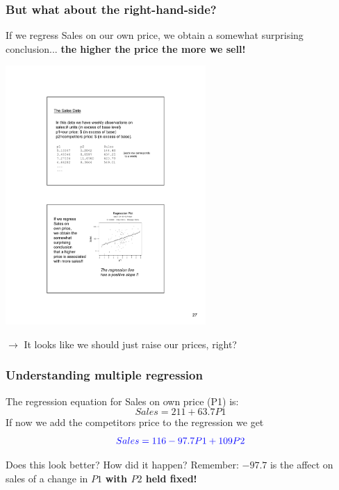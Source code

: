 \documentclass{beamer}
\newcommand{\sk}{\vspace{.5cm}}
\begin{document}
\begin{frame}
\frametitle{But what about the right-hand-side?}


If we regress Sales on our own price, we obtain a somewhat surprising conclusion... {\color{burntorange}\bf the higher the price the more we sell!}

\vspace{2mm}
\hspace*{10mm}\includegraphics[width=3in]{figures/Sales1}





$\rightarrow$ It looks like we should just raise our prices, right?

\end{frame}


\begin{frame}
\frametitle{Understanding multiple regression}

The regression equation for Sales on own price (P1) is: \sk
$$
Sales = 211 + 63.7 P1
$$
If now we add the competitors price to the regression we get \sk
$${\color{blue} 
	Sales = 116 - 97.7P1 + 109 P2}
$$

\sk 
Does this look better? How did it happen?
Remember: $-97.7$ is the affect on sales of a change in $P1$ {\color{burntorange}\bf with $P2$ held fixed!}

\end{frame}
\end{document}
